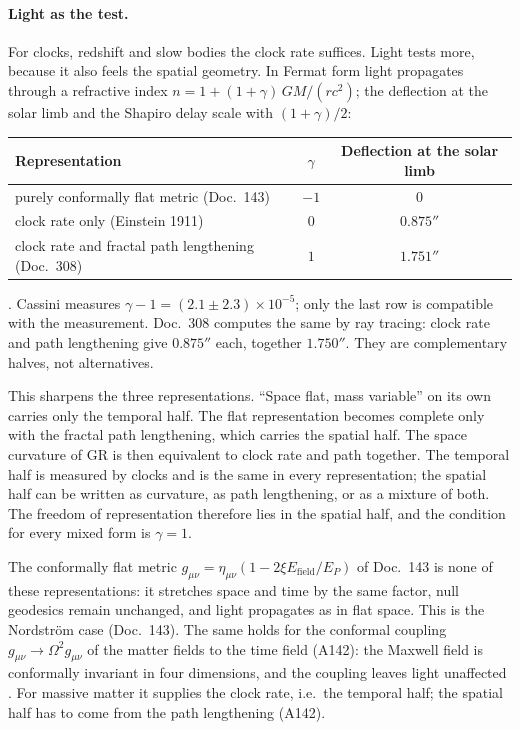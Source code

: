 \paragraph{Light as the test.} For clocks, redshift and slow bodies the clock rate suffices. Light
tests more, because it also feels the spatial geometry. In Fermat form light propagates through a
refractive index $n=1+(1+\gamma)\,GM/(rc^2)$; the deflection at the solar limb and the Shapiro
delay scale with $(1+\gamma)/2$:
\begin{center}
\begin{tabular}{lcc}
\toprule
Representation & $\gamma$ & Deflection at the solar limb \\
\midrule
purely conformally flat metric (Doc.~143) & $-1$ & $0$ \\
clock rate only (Einstein 1911) & $0$ & $0.875''$ \\
clock rate and fractal path lengthening (Doc.~308) & $1$ & $1.751''$ \\
\bottomrule
\end{tabular}
\end{center}
\KM. Cassini measures $\gamma-1=(2.1\pm2.3)\times10^{-5}$; only the last row is compatible with the
measurement. Doc.~308 computes the same by ray tracing: clock rate and path lengthening give
$0.875''$ each, together $1.750''$. They are complementary halves, not alternatives.

This sharpens the three representations. ``Space flat, mass variable'' on its own carries only the
temporal half. The flat representation becomes complete only with the fractal path lengthening,
which carries the spatial half. The space curvature of GR is then equivalent to clock rate and
path together. The temporal half is measured by clocks and is the same in every representation;
the spatial half can be written as curvature, as path lengthening, or as a mixture of both. The
freedom of representation therefore lies in the spatial half, and the condition for every mixed
form is $\gamma=1$.

The conformally flat metric $g_{\mu\nu}=\eta_{\mu\nu}(1-2\xi E_{\text{field}}/E_P)$ of Doc.~143 is
none of these representations: it stretches space and time by the same factor, null geodesics
remain unchanged, and light propagates as in flat space. This is the Nordström case (Doc.~143). The same holds for the conformal coupling
$g_{\mu\nu}\to\Omega^2g_{\mu\nu}$ of the matter fields to the time field (A142): the Maxwell field is
conformally invariant in four dimensions, and the coupling leaves light unaffected \BM. For massive
matter it supplies the clock rate, i.e.\ the temporal half; the spatial half has to come from the
path lengthening (A142).

